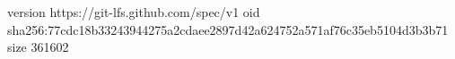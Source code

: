 version https://git-lfs.github.com/spec/v1
oid sha256:77cdc18b33243944275a2cdaee2897d42a624752a571af76c35eb5104d3b3b71
size 361602
